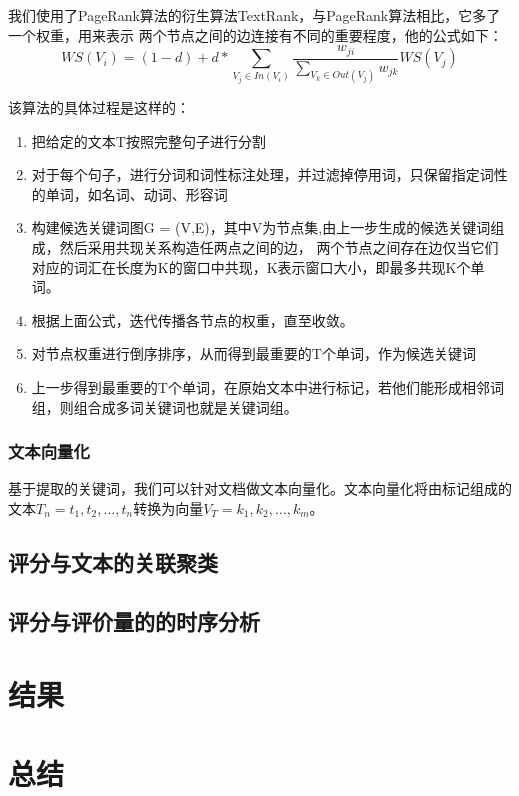 我们使用了PageRank算法的衍生算法TextRank，与PageRank算法相比，它多了一个权重，用来表示
两个节点之间的边连接有不同的重要程度，他的公式如下：
\begin{equation}
    W S\left(V_{i}\right)=(1-d)+d * \sum_{V_{j} \in I n\left(V_{i}\right)} \frac{w_{j i}}{\sum_{V_{k} \in O u t\left(V_{j}\right)} w_{j k}} W S\left(V_{j}\right)
\end{equation}

该算法的具体过程是这样的：
\begin{enumerate}
    \item 把给定的文本T按照完整句子进行分割
    \item 对于每个句子，进行分词和词性标注处理，并过滤掉停用词，只保留指定词性的单词，如名词、动词、形容词
    \item 构建候选关键词图G = (V,E)，其中V为节点集,由上一步生成的候选关键词组成，然后采用共现关系构造任两点之间的边，
    两个节点之间存在边仅当它们对应的词汇在长度为K的窗口中共现，K表示窗口大小，即最多共现K个单词。
    \item 根据上面公式，迭代传播各节点的权重，直至收敛。
    \item 对节点权重进行倒序排序，从而得到最重要的T个单词，作为候选关键词
    \item 上一步得到最重要的T个单词，在原始文本中进行标记，若他们能形成相邻词组，则组合成多词关键词也就是关键词组。
\end{enumerate}






\subsection{文本向量化}

基于提取的关键词，我们可以针对文档做文本向量化。文本向量化将由标记组成的
文本$T_n={t_1,t_2,\ldots,t_n}$转换为向量$V_T={k_1,k_2,\ldots,k_m}$。

\section{评分与文本的关联聚类}

\section{评分与评价量的的时序分析}

\chapter{结果}

\chapter{总结}

